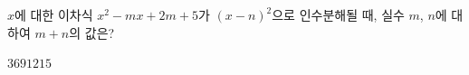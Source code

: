 $x$에 대한 이차식 $x^2-mx+2m+5$가 $(x-n)^2$으로 인수분해될 때, 실수 $m$, $n$에 대하여 $m+n$의 값은? 
\begin{choices32}{$3$}{$6$}{$9$}{$12$}{$15$}\end{choices32}
